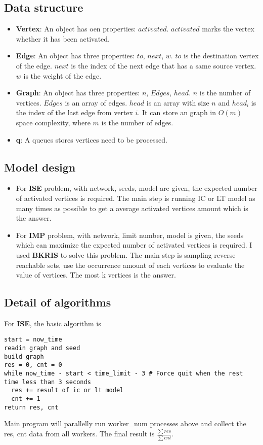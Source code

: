 \documentclass[lang=en,12pt]{elegantpaper}
\begin{document}
\subsection{Data structure}
\begin{itemize}
  \item \textbf{Vertex}: An object has oen properties: $activated$.
  $activated$ marks the vertex whether it has been activated.
  \item \textbf{Edge}: An object has three properties: $to$, $next$, $w$.
  $to$ is the destination vertex of the edge.
  $next$ is the index of the next edge that has a same source vertex.
  $w$ is the weight of the edge.
  \item \textbf{Graph}: An object has three properties: $n$, $Edges$, $head$.
  $n$ is the number of vertices. $Edges$ is an array of edges.
  $head$ is an array with size $n$ and $head_i$ is the index of the last edge from vertex $i$.
  It can store an graph in $O(m)$ space complexity, where $m$ is the number of edges.
  \item \textbf{q}: A queues stores vertices need to be processed.
\end{itemize}


\subsection{Model design}
\begin{itemize}
  \item For \textbf{ISE} problem, with network, seeds, model are given, the expected number of activated vertices is required.
  The main step is running IC or LT model as many times as possible to get a average activated vertices amount which is the answer.

  \item For \textbf{IMP} problem, with network, limit number, model is given, the seeds which can maximize the expected number of activated vertices is required.
  I used \textbf{BKRIS}\cite{7733128} to solve this problem. The main step is sampling reverse reachable sets, use the occurrence amount of each vertices to evaluate the value of vertices.
  The most k vertices is the answer.
\end{itemize}

\subsection{Detail of algorithms}
For \textbf{ISE}, the basic algorithm is
\begin{lstlisting}
start = now_time
readin graph and seed
build graph
res = 0, cnt = 0
while now_time - start < time_limit - 3 # Force quit when the rest time less than 3 seconds
  res += result of ic or lt model
  cnt += 1
return res, cnt
\end{lstlisting}
Main program will parallelly run worker\_num processes above and collect the res, cnt data from all workers.
The final result is $\frac{\sum{res}}{\sum{cnt}}$.
\end{document}
